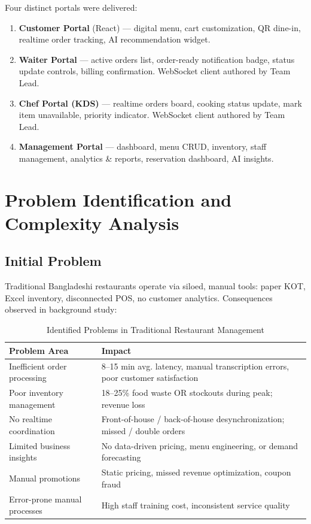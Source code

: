 Four distinct portals were delivered:
\begin{enumerate}
\item \textbf{Customer Portal} (React) --- digital menu, cart customization, QR dine-in, realtime order tracking, AI recommendation widget.
\item \textbf{Waiter Portal} --- active orders list, order-ready notification badge, status update controls, billing confirmation. WebSocket client authored by Team Lead.
\item \textbf{Chef Portal (KDS)} --- realtime orders board, cooking status update, mark item unavailable, priority indicator. WebSocket client authored by Team Lead.
\item \textbf{Management Portal} --- dashboard, menu CRUD, inventory, staff management, analytics \& reports, reservation dashboard, AI insights.
\end{enumerate}

\section{Problem Identification and Complexity Analysis}
\label{sec:problem}

\subsection{Initial Problem}

Traditional Bangladeshi restaurants operate via siloed, manual tools: paper KOT, Excel inventory, disconnected POS, no customer analytics. Consequences observed in background study:

\begin{table}[H]
\centering
\caption{Identified Problems in Traditional Restaurant Management}
\label{tab:problems}
\begin{tabularx}{\textwidth}{@{}p{}X@{}}
\toprule
\textbf{Problem Area} & \textbf{Impact} \\
\midrule
Inefficient order processing & 8--15 min avg. latency, manual transcription errors, poor customer satisfaction \\
Poor inventory management & 18--25\% food waste OR stockouts during peak; revenue loss \\
No realtime coordination & Front-of-house / back-of-house desynchronization; missed / double orders \\
Limited business insights & No data-driven pricing, menu engineering, or demand forecasting \\
Manual promotions & Static pricing, missed revenue optimization, coupon fraud \\
Error-prone manual processes & High staff training cost, inconsistent service quality \\
\bottomrule
\end{tabularx}
\end{table}

